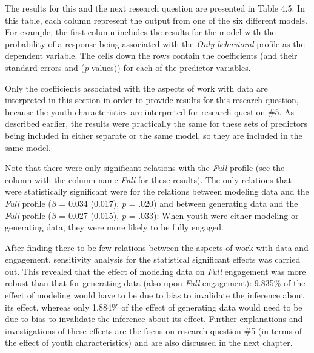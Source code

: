 \documentclass[]{book}
\theoremstyle{definition}
\theoremstyle{definition}
\theoremstyle{definition}
\theoremstyle{remark}
\begin{document}
The results for this and the next research question are presented in
Table 4.5. In this table, each column represent the output from one of
the six different models. For example, the first column includes the
results for the model with the probability of a response being
associated with the \emph{Only behavioral} profile as the dependent
variable. The cells down the rows contain the coefficients (and their
standard errors and (\emph{p}-values)) for each of the predictor
variables.

Only the coefficients associated with the aspects of work with data are
interpreted in this section in order to provide results for this
research question, because the youth characteristics are interpreted for
research question \#5. As described earlier, the results were
practically the same for these sets of predictors being included in
either separate or the same model, so they are included in the same
model.

Note that there were only significant relations with the \emph{Full}
profile (see the column with the column name \emph{Full} for these
results). The only relations that were statistically significant were
for the relations between modeling data and the \emph{Full} profile
(\(\beta\) = 0.034 (0.017), \emph{p} = .020) and between generating data
and the \emph{Full} profile (\(\beta\) = 0.027 (0.015), \emph{p} =
.033): When youth were either modeling or generating data, they were
more likely to be fully engaged.

After finding there to be few relations between the aspects of work with
data and engagement, sensitivity analysis for the statistical
significant effects was carried out. This revealed that the effect of
modeling data on \emph{Full} engagement was more robust than that for
generating data (also upon \emph{Full} engagement): 9.835\% of the
effect of modeling would have to be due to bias to invalidate the
inference about its effect, whereas only 1.884\% of the effect of
generating data would need to be due to bias to invalidate the inference
about its effect. Further explanations and investigations of these
effects are the focus on research question \#5 (in terms of the effect
of youth characteristics) and are also discussed in the next chapter.
\end{document}
